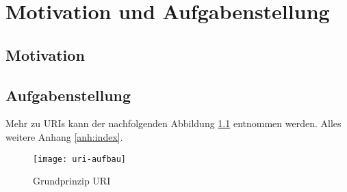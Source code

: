 \sffamily
\chapter{Motivation und Aufgabenstellung}\label{cha:Motivation}

\section{Motivation}
\blindtext

\section{Aufgabenstellung}
\blindtext
Mehr zu \acp{URI} kann der nachfolgenden Abbildung \ref{fig:uri} entnommen werden. Alles weitere Anhang \ref{anh:index}.

\begin{figure}[H]
	\centering
	\texttt{[image: uri-aufbau]}
	\caption{Grundprinzip \acs{URI}}
	\label{fig:uri}
\end{figure}

\blindtext
